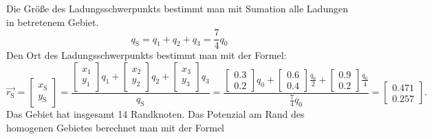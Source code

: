 \documentclass[Protokollheft.tex]{subfiles}
\begin{document}
Die Größe des Ladungsschwerpunkts bestimmt man mit Sumation alle Ladungen in betretenem Gebiet.
$$ q_{\text{S}}=q_1 + q_2 + q_3= \frac{7}{4}q_0 $$
Den Ort des Ladungsschwerpunkts bestimmt man mit der Formel:
$$\vec{r_\text{S}}=\begin{bmatrix}
x_{\text{S}} \\
 y_{\text{S}}  
\end{bmatrix}=
\frac{\begin{bmatrix}
	x_{\text{1}} \\
	y_{\text{1}}  
	\end{bmatrix}q_1+
\begin{bmatrix}
x_{\text{2}} \\
y_{\text{2}}  
\end{bmatrix}q_2+
\begin{bmatrix}
x_{\text{3}} \\
y_{\text{3}}  
\end{bmatrix}q_3}{q_{\text{S}}}=
\frac{\begin{bmatrix}
	0.3 \\
	0.2  
	\end{bmatrix}q_0+
	\begin{bmatrix}
	0.6 \\
	0.4  
	\end{bmatrix}\frac{q_0}{2}+
	\begin{bmatrix}
	0.9 \\
	0.2  
	\end{bmatrix}\frac{q_0}{4}}{\frac{7}{4}q_0}=
\begin{bmatrix}
0.471 \\
0.257  
\end{bmatrix}
.
$$
Das Gebiet hat insgesamt 14 Randknoten. Das Potenzial am Rand des homogenen Gebietes berechnet man mit der Formel
\end{document}

